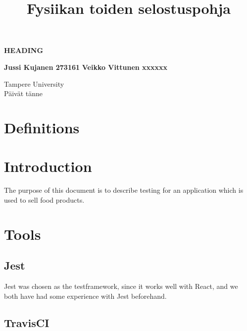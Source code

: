 \documentclass[a4paper, 12pt]{article}
\title{Fysiikan toiden selostuspohja}
\begin{document}
\begin{titlepage}
    \begin{center}
        \vspace*{1cm}
 
        \textbf{HEADING}
 
        \vspace{0.5cm}
       
             
        \vspace{1.5cm}
 
        \textbf{Jussi Kujanen 273161}
        \textbf{Veikko Vittunen xxxxxx}
 
        \vfill
             
    
             
        \vspace{0.8cm}
      
   
             
       
        Tampere University\\
       Päivät tänne
             
    \end{center}
 \end{titlepage} 



\newpage
\thispagestyle{empty}
\tableofcontents

\newpage
\clearpage
{} 

\section{Definitions}

\section{Introduction}
The purpose of this document is to describe testing for an application which is used to sell food products.
\section{Tools}

    \subsection{Jest}
    Jest was chosen as the testframework, since it works well with React, and we both have had some experience with Jest beforehand.
    \subsection{TravisCI}
\end{document}
